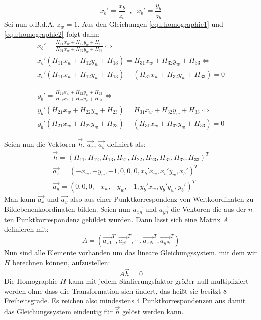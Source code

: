 \begin{equation}
\label{equ:homographie2}
	x_b\prime = \frac{x_b}{z_b} \;\;,\;\; x_b\prime = \frac{y_b}{z_b}
\end{equation} 
Sei nun o.B.d.A. \(z_w = 1\). Aus den Gleichungen \ref{equ:homographie1} und \ref{equ:homographie2} folgt dann:
\begin{gather}
\label{equ:homographie3}
	x_b\prime = \frac{H_{11}x_w + H_{12}y_w + H_{13}}{H_{31}x_w + H_{32}y_w + H_{33}} \Leftrightarrow \\
	x_b\prime \left( H_{11}x_w + H_{12}y_w + H_{13} \right) = H_{31}x_w + H_{32}y_w + H_{33}\Leftrightarrow \\
	x_b\prime \left( H_{11}x_w + H_{12}y_w + H_{13} \right) - \left( H_{31}x_w + H_{32}y_w + H_{33}\right) = 0
\end{gather}

\begin{gather}
\label{equ:homographie4}
	y_b\prime = \frac{H_{21}x_w + H_{22}y_w + H_{23}}{H_{31}x_w + H_{32}y_w + H_{33}} \Leftrightarrow \\
	y_b\prime \left( H_{21}x_w + H_{22}y_w + H_{23} \right) = H_{31}x_w + H_{32}y_w + H_{33}\Leftrightarrow \\
	y_b\prime \left( H_{21}x_w + H_{22}y_w + H_{23} \right) - \left( H_{31}x_w + H_{32}y_w + H_{33} \right) = 0
\end{gather}

Seien nun die Vektoren \(\vec{h}\), \(\vec{a_x}\), \(\vec{a_y}\) definiert als:
\begin{gather}
	\vec{h} = \left( H_{11}, H_{12}, H_{13}, H_{21}, H_{22}, H_{23}, H_{31}, H_{32}, H_{33} \right)^{T} \\
	\vec{a_x} = \left( -x_w, -y_w, -1, 0, 0, 0, x_b\prime x_w, x_b\prime y_w, x_b\prime \right)^{T} \\
	\vec{a_y} = \left( 0, 0, 0, -x_w, -y_w, -1, y_b\prime x_w, y_b\prime y_w, y_b\prime \right)^{T}
\end{gather}
Man kann \(\vec{a_{x}}\) und \(\vec{a_{y}}\) also aus einer Punktkorrespondenz von Weltkoordinaten zu Bildebenenkoordinaten bilden. Seien nun \(\vec{a_{xn}}\) und \(\vec{a_{yn}}\) die Vektoren die aus der \(n\)-ten Punktkorrespondenz gebildet wurden. Dann lässt sich eine Matrix \(A\) definieren mit:
\begin{equation}
	A = \left( \vec{a_{x1}}^{T}, \vec{a_{y1}}^{T}, \cdots , \vec{a_{xN}}^{T}, \vec{a_{yN}}^{T} \right)
\end{equation}
Nun sind alle Elemente  vorhanden um das lineare Gleichungssystem, mit dem wir \(H\) berechnen können, aufzustellen:
\begin{equation}
	A\vec{h} = 0
\end{equation}
Die Homographie \(H\) kann mit jedem Skalierungsfaktor größer null multipliziert werden ohne dass die Transformation sich ändert, das heißt sie besitzt 8 Freiheitsgrade. Es reichen also mindestens 4 Punktkorrespondenzen aus damit das Gleichungssystem eindeutig für \(\vec{h}\) gelöst werden kann. 

